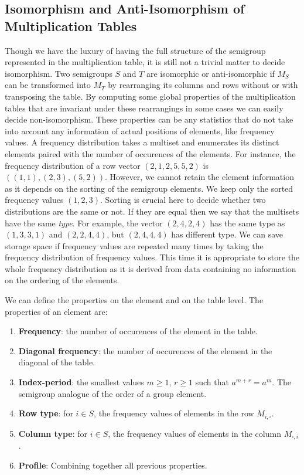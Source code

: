 \documentclass{amsart}
\theoremstyle{plain}
\theoremstyle{definition}
\begin{document}
\subsection{Isomorphism and Anti-Isomorphism of Multiplication Tables}
Though we have the luxury of having the full structure of the semigroup represented in the multiplication table, it is still not a trivial matter to decide isomorphism.
Two semigroups $S$ and $T$ are isomorphic or anti-isomorphic if $M_S$ can be transformed into $M_T$ by rearranging its columns and rows without or with transposing the table.
By computing some global properties of the multiplication tables that are invariant under these rearrangings in some cases we can easily decide non-isomorphism.
These properties can be any statistics that do not take into account any information of actual positions of elements, like frequency values.
A frequency distribution takes a multiset and enumerates its distinct elements paired with the number of occurences of the elements.
For instance, the  frequency distribution of a row vector $(2,1,2,5,5,2)$ is $((1,1),(2,3),(5,2))$.
However, we cannot retain the element information as it depends on the sorting of the semigroup elements.
We keep only the sorted frequency values $(1,2,3)$.
Sorting is crucial here to decide whether two distributions are the same or not.
If they are equal then we say that the multisets have the same \emph{type}.
For example, the vector $(2,4,2,4)$ has the same type as $(1,3,3,1)$ and $(2,2,4,4)$, but $(2,4,4,4)$ has different type.
We can save storage space if frequency values are repeated many times by taking the frequency distribution of frequency values.
This time it is appropriate to store the whole frequency distribution as it is derived from data containing no information on the ordering of the elements.

We can define the properties on the element and on the table level. The properties of an element are:

\begin{enumerate}
\item\textbf{Frequency}: the number of occurences of the element in the table.
\item \textbf{Diagonal frequency}: the number of occurences of the element in the diagonal of the table.
\item \textbf{Index-period}: the smallest values $m\geq 1$, $r\geq 1$ such that $a^{m+r}=a^m$. The semigroup analogue of the order of a group element.
\item \textbf{Row type}: for $i\in S$, the frequency values of elements in the row $M_{i,\square}$.
\item \textbf{Column type}:  for $i\in S$, the frequency values of elements in the column $M_{\square,i}$.
\item \textbf{Profile}: Combining together all previous properties.
\end{enumerate} 
\end{document}
